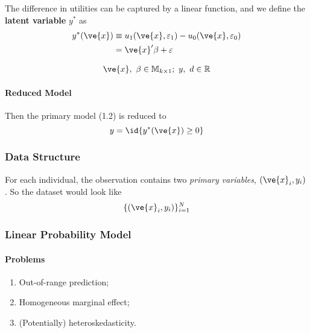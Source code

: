 \documentclass[11pt]{article}
\begin{document}
				\begin{assumption}
					The difference in utilities can be captured by a linear function, and we define the \textbf{latent variable} $y^*$ as
					\begin{align}
						y^*(\ve{x}) &\equiv u_1(\ve{x}, \varepsilon_1) - u_0(\ve{x}, \varepsilon_0) \\
						&= \ve{x}' \beta + \varepsilon
					\end{align}
				\end{assumption}
				
				\begin{remark}
					\begin{gather}
						\ve{x},\ \beta \in \mathbb{M}_{k \times 1};\ y,\ d \in \R
					\end{gather}
				\end{remark}
				\paragraph{Reduced Model} Then the primary model (1.2) is reduced to
				\begin{equation}
					y = \id{y^*(\ve{x}) \geq 0}
				\end{equation}
			
			\subsubsection{Data Structure}
				\par For each individual, the observation contains two \emph{primary variables}, $(\ve{x}_i, y_i)$. So the dataset would look like
					\begin{gather}
						\{(\ve{x}_i, y_i)\}_{i=1}^N
					\end{gather}
			
			\subsubsection{Linear Probability Model}
				\paragraph{Problems} \quad
				\begin{enumerate}
					\item Out-of-range prediction;
					\item Homogeneous marginal effect;
					\item (Potentially) heteroskedasticity.	
				\end{enumerate}
\end{document}
